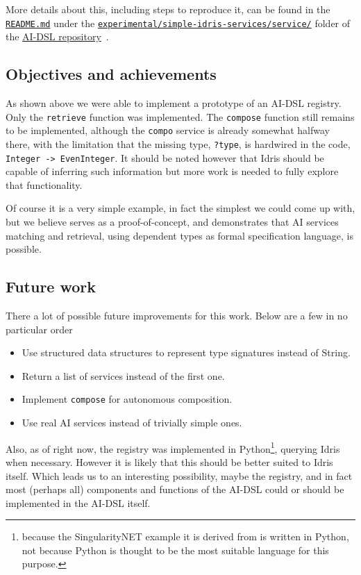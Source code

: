 \documentclass[]{report}
\begin{document}
More details about this, including steps to reproduce it, can be found
in the
\href{https://github.com/singnet/ai-dsl/blob/master/experimental/registry-dsl/README.md}{\texttt{README.md}}
under the
\href{https://github.com/singnet/ai-dsl/blob/master/experimental/registry-dsl/}{\texttt{experimental/simple-idris-services/service/}}
folder of the \href{https://github.com/singnet/ai-dsl/}{AI-DSL
  repository}~\cite{AIDSLRepo}.

\subsection{Objectives and achievements}

As shown above we were able to implement a prototype of an AI-DSL
registry.  Only the \texttt{retrieve} function was implemented.  The
\texttt{compose} function still remains to be implemented, although
the \texttt{compo} service is already somewhat halfway there, with the
limitation that the missing type, \texttt{?type}, is hardwired in the
code, \texttt{Integer -> EvenInteger}.  It should be noted however
that Idris should be capable of inferring such information but more
work is needed to fully explore that functionality.

Of course it is a very simple example, in fact the simplest we could
come up with, but we believe serves as a proof-of-concept, and
demonstrates that AI services matching and retrieval, using dependent
types as formal specification language, is possible.

\subsection{Future work}

There a lot of possible future improvements for this work.  Below are
a few in no particular order
\begin{itemize}
\item Use structured data structures to represent type signatures
  instead of String.
\item Return a list of services instead of the first one.
\item Implement \texttt{compose} for autonomous composition.
\item Use real AI services instead of trivially simple ones.
\end{itemize}

Also, as of right now, the registry was implemented in
Python\footnote{because the SingularityNET example it is derived from
is written in Python, not because Python is thought to be the most
suitable language for this purpose.}, querying Idris when necessary.
However it is likely that this should be better suited to Idris
itself.  Which leads us to an interesting possibility, maybe the
registry, and in fact most (perhaps all) components and functions of
the AI-DSL could or should be implemented in the AI-DSL itself.
\end{document}
